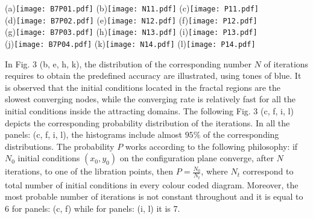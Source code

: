 \documentclass[preprint,fleqn,5p,numbers,sort&compress]{elsarticle}
\begin{document}
\begin{figure*}
\label{Fig:4}
\begin{center}
(a)\texttt{[image: B7P01.pdf]}
(b)\texttt{[image: N11.pdf]}
(c)\texttt{[image: P11.pdf]}\\
(d)\texttt{[image: B7P02.pdf]}
(e)\texttt{[image: N12.pdf]}
(f)\texttt{[image: P12.pdf]}\\
(g)\texttt{[image: B7P03.pdf]}
(h)\texttt{[image: N13.pdf]}
(i)\texttt{[image: P13.pdf]}\\
(j)\texttt{[image: B7P04.pdf]}
(k)\texttt{[image: N14.pdf]}
(l)\texttt{[image: P14.pdf]}
\caption{The Newton-Raphson basins of attraction on the $(x,y)$ plane for
the case when seven libration points exist for:  (a) $e=-0.1956$; (d) $e=-0.2129$;
 (g) $e=-0.2318$; (j) $e=-0.2329$. The color code denoting the attractors is as follows:
  $L_4$ (\emph{green}); $L_8$ (\emph{purple}); $L_9$ (\emph{crimson}); $L_{10}$
  (\emph{teal}); $L_{11}$ (\emph{magenta}); $L_{12}$ (\emph{orange}); $L_{13}$
  (\emph{light green}) and non-converging points (\emph{white}). (b, e, h, k: the middle panels)
  the corresponding
  distribution of the number $N$ of required iterations for obtaining the attracting
  regions, (c, f, i, l: the right panels) the corresponding probability distributions of required number of iterations
  for obtaining the Newton-Raphson basins of convergence, shown in panels-(a, d, g, j) respectively. The vertical, dashed, red line indicates, in each case,
the most probable number $N^*$ of iterations. The black dots show the position of the libration points. (Color figure online).}
\end{center}
\end{figure*}
In Fig. \textcolor[rgb]{1.00,0.00,0.50}{3} (b, e, h, k), the distribution of the corresponding number $N$ of iterations requires to obtain the predefined accuracy are illustrated, using tones of blue. It is observed that the initial conditions located in the fractal regions are the slowest converging nodes, while the converging rate is relatively fast for all the initial conditions inside the attracting domains. The following Fig. \textcolor[rgb]{1.00,0.00,0.50}{3} (c, f, i, l) depicts the corresponding probability distribution of the iterations. In all the panels: (c, f, i, l), the histograms include almost $95\%$  of the corresponding distributions. The probability $P$ works according to the following philosophy: if $N_0$ initial conditions $(x_0, y_0)$ on the configuration plane converge, after $N$ iterations, to one of the libration points, then $P=\frac{N_0}{N_t}$, where $N_t$ correspond to total number of initial conditions in every colour coded diagram. Moreover, the most probable number of iterations is not constant throughout and it is equal to 6 for panels: (c, f) while for panels: (i, l) it is 7.
\end{document}
